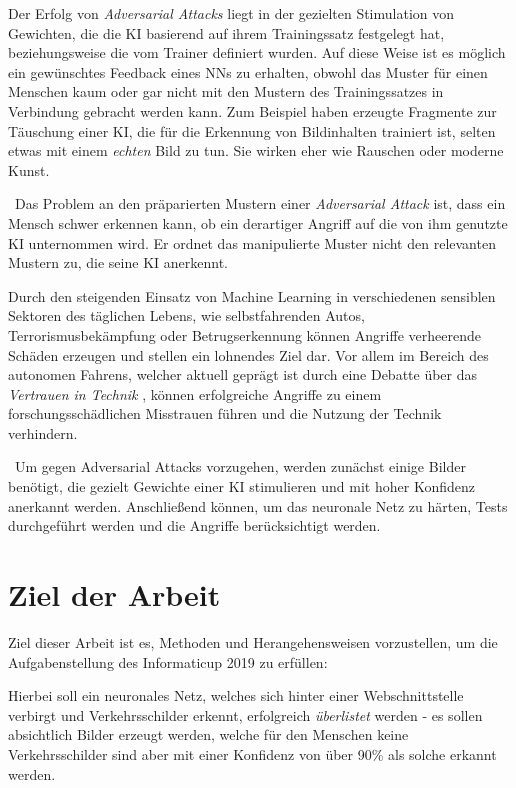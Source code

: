 Der Erfolg von \textit{Adversarial Attacks} liegt in der gezielten Stimulation von Gewichten, die die \ac{KI} basierend auf ihrem Trainingssatz festgelegt hat, beziehungsweise die vom Trainer definiert wurden. Auf diese Weise ist es möglich ein gewünschtes Feedback eines \acs{NN}s zu erhalten, obwohl das Muster für einen Menschen kaum oder gar nicht mit den Mustern des Trainingssatzes in Verbindung gebracht werden kann. Zum Beispiel haben erzeugte Fragmente zur Täuschung einer \ac{KI}, die für die Erkennung von Bildinhalten trainiert ist, selten etwas mit einem \textit{echten} Bild zu tun. Sie wirken eher wie Rauschen oder moderne Kunst. 

~\newline Das Problem an den präparierten Mustern einer \textit{Adversarial Attack} ist, dass ein Mensch schwer erkennen kann, ob ein derartiger Angriff auf die von ihm genutzte \ac{KI} unternommen wird. Er ordnet das manipulierte Muster nicht den relevanten Mustern zu, die seine \ac{KI} anerkennt.

Durch den steigenden Einsatz von Machine Learning in verschiedenen sensiblen Sektoren des täglichen Lebens, wie selbstfahrenden Autos, Terrorismusbekämpfung oder Betrugserkennung können Angriffe verheerende Schäden erzeugen und stellen ein lohnendes Ziel dar. Vor allem im Bereich des autonomen Fahrens, welcher aktuell geprägt ist durch eine Debatte über das \textit{Vertrauen in Technik} \cite{VertrauenTechnik}, können erfolgreiche Angriffe zu einem forschungsschädlichen Misstrauen führen und die Nutzung der Technik verhindern. 

~\newline Um gegen Adversarial Attacks vorzugehen, werden zunächst einige Bilder benötigt, die gezielt Gewichte einer \ac{KI} stimulieren und mit hoher Konfidenz anerkannt werden. Anschließend können, um das neuronale Netz zu härten, Tests durchgeführt werden und die Angriffe berücksichtigt werden. 


\section{Ziel der Arbeit}
\label{sec:ZielDerArbeit}
Ziel dieser Arbeit ist es, Methoden und Herangehensweisen vorzustellen, um die Aufgabenstellung des Informaticup 2019  zu erfüllen: 

Hierbei soll ein neuronales Netz, welches sich hinter einer Webschnittstelle verbirgt und Verkehrsschilder erkennt, erfolgreich \textit{überlistet} werden - es sollen absichtlich Bilder erzeugt werden, welche für den Menschen keine Verkehrsschilder sind aber mit einer Konfidenz von über 90\% als solche erkannt werden. 

